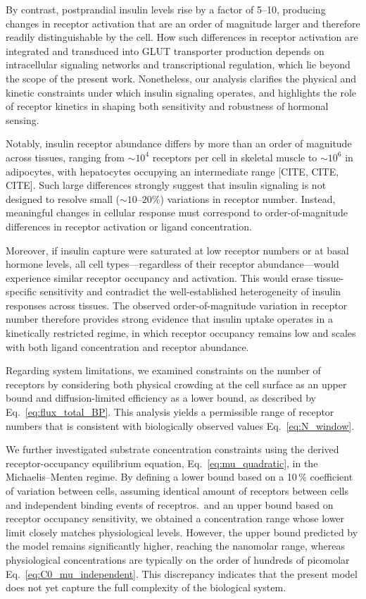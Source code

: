 By contrast, postprandial insulin levels rise by a factor of 5--10, producing changes in receptor activation that are an order of magnitude larger and therefore readily distinguishable by the cell.
How such differences in receptor activation are integrated and transduced into GLUT transporter production depends on intracellular signaling networks and transcriptional regulation, which lie beyond the scope of the present work.
Nonetheless, our analysis clarifies the physical and kinetic constraints under which insulin signaling operates, and highlights the role of receptor kinetics in shaping both sensitivity and robustness of hormonal sensing.

Notably, insulin receptor abundance differs by more than an order of magnitude across tissues, ranging from $\sim 10^{4}$ receptors per cell in skeletal muscle to $\sim 10^{6}$ in adipocytes, with hepatocytes occupying an intermediate range [CITE, CITE, CITE].
Such large differences strongly suggest that insulin signaling is not designed to resolve small ($\sim 10$--$20\%$) variations in receptor number.
Instead, meaningful changes in cellular response must correspond to order-of-magnitude differences in receptor activation or ligand concentration.

Moreover, if insulin capture were saturated at low receptor numbers or at basal hormone levels, all cell types---regardless of their receptor abundance---would experience similar receptor occupancy and activation.
This would erase tissue-specific sensitivity and contradict the well-established heterogeneity of insulin responses across tissues.
The observed order-of-magnitude variation in receptor number therefore provides strong evidence that insulin uptake operates in a kinetically restricted regime, in which receptor occupancy remains low and scales with both ligand concentration and receptor abundance.

Regarding system limitations, we examined constraints on the number of receptors by considering both physical crowding at the cell surface as an upper bound and diffusion-limited efficiency as a lower bound, as described by Eq.~\eqref{eq:flux_total_BP}.
This analysis yields a permissible range of receptor numbers that is consistent with biologically observed values Eq.~\eqref{eq:N_window}.

We further investigated substrate concentration constraints using the derived receptor-occupancy equilibrium equation, Eq.~\eqref{eq:mu_quadratic}, in the Michaelis--Menten regime.
By defining a lower bound based on a 10\,\% coefficient of variation between cells, assuming identical amount of receptors between cells and independent binding events of receptros.\ and an upper bound based on receptor occupancy sensitivity, we obtained a concentration range whose lower limit closely matches physiological levels.
However, the upper bound predicted by the model remains significantly higher, reaching the nanomolar range, whereas physiological concentrations are typically on the order of hundreds of picomolar Eq.~\eqref{eq:C0_mu_independent}.
This discrepancy indicates that the present model does not yet capture the full complexity of the biological system.
